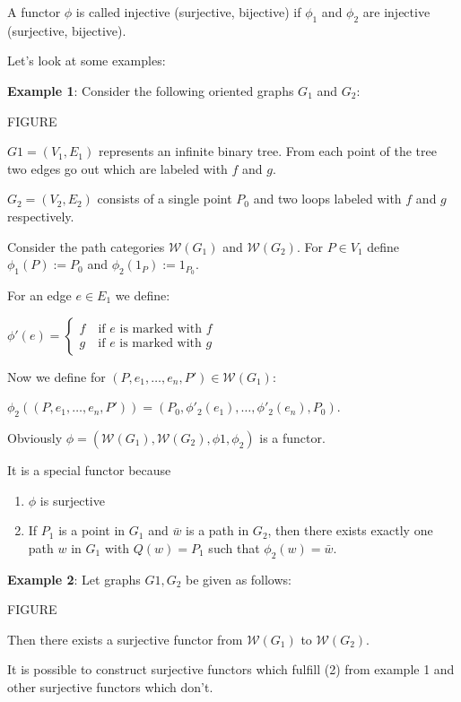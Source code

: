 A functor $\phi$ is called injective (surjective, bijective) if $\phi_1$ and
$\phi_2$ are injective (surjective, bijective).

Let's look at some examples:

{\bf Example 1}: Consider the following oriented graphs $G_1$ and $G_2$:

FIGURE

$G1 = (V_1, E_1)$ represents an infinite binary tree. From each point of the
tree two edges go out which are labeled with $f$ and $g$.

$G_2 = (V_2, E_2)$ consists of a single point $P_0$ and two loops labeled with
$f$ and $g$ respectively.

Consider the path categories $\mathcal{W}(G_1)$ and $\mathcal{W}(G_2)$. For $P
\in V_1$ define $\phi_1(P) := P_0$ and $\phi_2(1_P) := 1_{P_0}$.

For an edge $e \in E_1$ we define:

$ \phi'(e) = \left\{ \begin{array}{l}
	f\quad \mbox{if $e$ is marked with $f$} \\ 
	g\quad \mbox{if $e$ is marked with $g$}
	\end{array} \right. $

Now we define for $(P, e_1, \ldots, e_n, P') \in \mathcal{W}(G_1)$:

$\phi_2((P, e_1, \ldots, e_n, P')) = (P_0, \phi'_2(e_1), \ldots, \phi'_2(e_n),
P_0)$.

Obviously $\phi = (\mathcal{W}(G_1), \mathcal{W}(G_2), \phi1, \phi_2)$ is a
functor.

It is a special functor because

\begin{enumerate}
  \item $\phi$ is surjective
  \item If $P_1$ is a point in $G_1$ and $\bar{w}$ is a path in $G_2$, then
  there exists exactly one path $w$ in $G_1$ with $Q(w) = P_1$ such that
  $\phi_2(w) = \bar{w}$.
\end{enumerate}

{\bf Example 2}: Let graphs $G1, G_2$ be given as follows:

FIGURE

Then there exists a surjective functor from $\mathcal{W}(G_1)$ to
$\mathcal{W}(G_2)$.

It is possible to construct surjective functors which fulfill (2) from example 1
and other surjective functors which don't.

